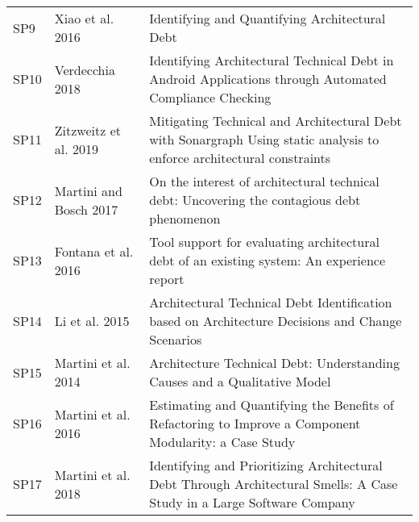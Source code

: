 \begin{tabular}{lll}
  SP9 &                                                         Xiao et al. 2016 &                                                                                                                            Identifying and Quantifying Architectural Debt \\
 SP10 &                                                          Verdecchia 2018 &                                                                    Identifying Architectural Technical Debt in Android Applications through Automated Compliance Checking \\
 SP11 &                                                    Zitzweitz et al. 2019 &                                                    Mitigating Technical and Architectural Debt with Sonargraph Using static analysis to enforce architectural constraints \\
 SP12 &                                                   Martini and Bosch 2017 &                                                                                On the interest of architectural technical debt: Uncovering the contagious debt phenomenon \\
 SP13 &                                                      Fontana et al. 2016 &                                                                                Tool support for evaluating architectural debt of an existing system: An experience report \\
 SP14 &                                                           Li et al. 2015 &                                                                          Architectural Technical Debt Identification based on Architecture Decisions and Change Scenarios \\
 SP15 &                                                      Martini et al. 2014 &                                                                                                 Architecture Technical Debt: Understanding Causes and a Qualitative Model \\
 SP16 &                                                      Martini et al. 2016 &                                                                    Estimating and Quantifying the Benefits of Refactoring to Improve a Component Modularity: a Case Study \\
 SP17 &                                                      Martini et al. 2018 &                                                    Identifying and Prioritizing Architectural Debt Through Architectural Smells: A Case Study in a Large Software Company \\

\end{tabular}
